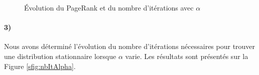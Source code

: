 \documentclass[a4paper,titlepage]{report}
\begin{document}
\begin{figure}[h]
	\center
	\caption{Évolution du PageRank et du nombre d'itérations avec $\alpha$}
\end{figure}
\paragraph{3)}
Nous avons déterminé l'évolution du nombre d'itérations nécessaires pour trouver une distribution stationnaire lorsque $\alpha$ varie. Les résultats sont présentés sur la Figure \ref{sfig:nbItAlpha}.
\end{document}
